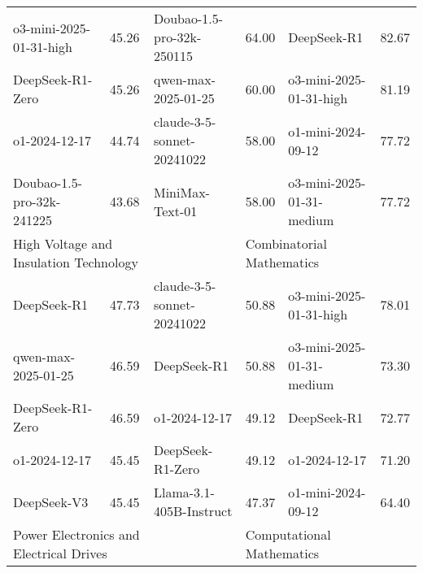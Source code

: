 {\begin{longtable}{p{4.2cm}>{\centering\arraybackslash} p{0.8cm}|p{4.2cm} >{\centering\arraybackslash} p{0.8cm}|p{4.2cm} >{\centering\arraybackslash} p{0.8cm}}
\cellcolor{blue!5} o3-mini-2025-01-31-high & \cellcolor{blue!2}45.26 & \cellcolor{purple!5} Doubao-1.5-pro-32k-250115 & \cellcolor{purple!2} 64.00 & \cellcolor{green!5} DeepSeek-R1 & \cellcolor{green!2} 82.67\\
\cellcolor{blue!5} DeepSeek-R1-Zero & \cellcolor{blue!2}45.26 & \cellcolor{purple!5} qwen-max-2025-01-25 & \cellcolor{purple!2} 60.00 & \cellcolor{green!5} o3-mini-2025-01-31-high & \cellcolor{green!2} 81.19\\
\cellcolor{blue!5} o1-2024-12-17 & \cellcolor{blue!2}44.74 & \cellcolor{purple!5} claude-3-5-sonnet-20241022 & \cellcolor{purple!2} 58.00 & \cellcolor{green!5} o1-mini-2024-09-12 & \cellcolor{green!2} 77.72\\
\cellcolor{blue!5} Doubao-1.5-pro-32k-241225 & \cellcolor{blue!2}43.68 & \cellcolor{purple!5} MiniMax-Text-01 & \cellcolor{purple!2} 58.00 & \cellcolor{green!5} o3-mini-2025-01-31-medium & \cellcolor{green!2} 77.72\\
\hline
\multicolumn{2}{p{5.15cm}|}{\cellcolor{blue!10} \centering High Voltage and Insulation Technology} & \multicolumn{2}{p{5.15cm}|}{\cellcolor{purple!10} \centering Russian Language and Literature} & \multicolumn{2}{p{5.15cm}}{\cellcolor{green!10} \centering Combinatorial Mathematics}\\
\hline
\cellcolor{blue!5} DeepSeek-R1 & \cellcolor{blue!2}47.73 & \cellcolor{purple!5} claude-3-5-sonnet-20241022 & \cellcolor{purple!2} 50.88 & \cellcolor{green!5} o3-mini-2025-01-31-high & \cellcolor{green!2} 78.01\\
\cellcolor{blue!5} qwen-max-2025-01-25 & \cellcolor{blue!2}46.59 & \cellcolor{purple!5} DeepSeek-R1 & \cellcolor{purple!2} 50.88 & \cellcolor{green!5} o3-mini-2025-01-31-medium & \cellcolor{green!2} 73.30\\
\cellcolor{blue!5} DeepSeek-R1-Zero & \cellcolor{blue!2}46.59 & \cellcolor{purple!5} o1-2024-12-17 & \cellcolor{purple!2} 49.12 & \cellcolor{green!5} DeepSeek-R1 & \cellcolor{green!2} 72.77\\
\cellcolor{blue!5} o1-2024-12-17 & \cellcolor{blue!2}45.45 & \cellcolor{purple!5} DeepSeek-R1-Zero & \cellcolor{purple!2} 49.12 & \cellcolor{green!5} o1-2024-12-17 & \cellcolor{green!2} 71.20\\
\cellcolor{blue!5} DeepSeek-V3 & \cellcolor{blue!2}45.45 & \cellcolor{purple!5} Llama-3.1-405B-Instruct & \cellcolor{purple!2} 47.37 & \cellcolor{green!5} o1-mini-2024-09-12 & \cellcolor{green!2} 64.40\\
\hline
\multicolumn{2}{p{5.15cm}|}{\cellcolor{blue!10} \centering Power Electronics and Electrical Drives} & \multicolumn{2}{p{5.15cm}|}{\cellcolor{purple!10} \centering Composition} & \multicolumn{2}{p{5.15cm}}{\cellcolor{green!10} \centering Computational Mathematics}\\

\end{longtable}}
